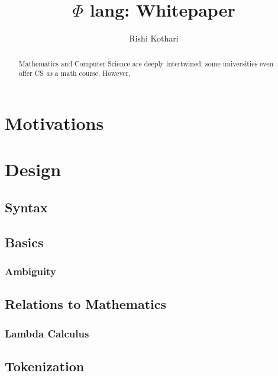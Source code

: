 \documentclass[11pt, oneside]{article}
\title{$\Phi$ lang: Whitepaper}
\author{Rishi Kothari}
\date{}
\begin{document}
\maketitle

\newpage

\tableofcontents
\newpage
{}
\begin{abstract}
	Mathematics and Computer Science are deeply intertwined; some universities even offer CS \textit{as} a math course. However, 
\end{abstract}

\section{Motivations}


\section{Design}

\subsection{Syntax}


\subsection{Basics}


\subsubsection{Ambiguity}


\subsection{Relations to Mathematics}

\subsubsection{Lambda Calculus}

\subsection{Tokenization}
\end{document}
